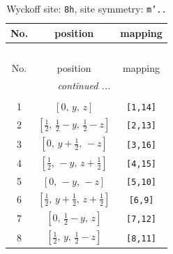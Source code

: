 \documentclass[fleqn,8pt]{jsarticle}
\begin{document}
\begin{longtable}{ccc}
\caption{Wyckoff site: {\tt 8h}, site symmetry: {\tt m'..}}
 \\
 \hline \hline
No. & position & mapping \\ \hline \endfirsthead

\multicolumn{2}{l}{\tablename\ \thetable{}} \\
 \hline \hline
No. & position & mapping \\ \hline \endhead

 \hline \hline
\multicolumn{2}{r}{\footnotesize\it continued ...} \\ \endfoot

 \hline \hline
\multicolumn{2}{r}{} \\ \endlastfoot

1 & $\left[ 0,\, y,\, z \right]$ & {\tt [1,14]} \\ \hline
2 & $\left[ \frac{1}{2},\, \frac{1}{2} - y,\, \frac{1}{2} - z \right]$ & {\tt [2,13]} \\ \hline
3 & $\left[ 0,\, y + \frac{1}{2},\, - z \right]$ & {\tt [3,16]} \\ \hline
4 & $\left[ \frac{1}{2},\, - y,\, z + \frac{1}{2} \right]$ & {\tt [4,15]} \\ \hline
5 & $\left[ 0,\, - y,\, - z \right]$ & {\tt [5,10]} \\ \hline
6 & $\left[ \frac{1}{2},\, y + \frac{1}{2},\, z + \frac{1}{2} \right]$ & {\tt [6,9]} \\ \hline
7 & $\left[ 0,\, \frac{1}{2} - y,\, z \right]$ & {\tt [7,12]} \\ \hline
8 & $\left[ \frac{1}{2},\, y,\, \frac{1}{2} - z \right]$ & {\tt [8,11]} \\
\end{longtable}
\renewcommand{\arraystretch}{1.2}
\end{document}
